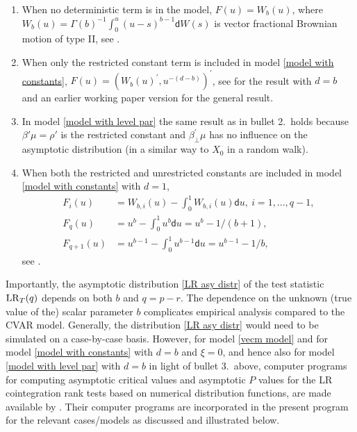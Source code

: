\documentclass[article]{jss}
\def\lrt{{\rm LR}_T}
\begin{document}
 \begin{enumerate}
 \item When no deterministic term is in the model, $F(u)=W_{b}(u)$, where $W_{b}(u)=\Gamma(b)^{-1}\int_{0}^{u}(u-s)^{b-1}\mathsf{d}W(s)$ is vector fractional Brownian motion of type II, see \citet[Theorem 11(i)]{johansen2012likelihood}.
 \item When only the restricted constant term is included in model \eqref{model with constants}, $F(u)=(W_{b}(u)^{\prime},u^{-(d-b)})^{\prime }$, see \citet[Theorem 11(iv)]{johansen2012likelihood} for the result with $d=b$ and an earlier working paper version for the general result.
\item In model \eqref{model with level par} the same result as in bullet 2.\ holds because $\beta'\mu = \rho'$ is the restricted constant and $\beta_\perp^{\prime} \mu$ has no influence on the asymptotic distribution (in a similar way to $X_0$ in a random walk).
 \item When both the restricted and unrestricted constants are included in model \eqref{model with constants} with $d=1$,
\begin{align*}
F_{i}(u) &= W_{b,i}(u) - \int_{0}^{1} W_{b,i}(u) \mathsf{d} u, \ i=1,...,q-1, \\
F_{q}(u) &= u^{b} - \int_{0}^{1}u^{b} \mathsf{d} u=u^{b}-1/(b+1), \\
F_{q+1}(u) &= u^{b-1} - \int_{0}^{1}u^{b-1} \mathsf{d} u = u^{b-1}-1/b, 
\end{align*}
see \cite{Dolatabadi2014}.
\end{enumerate}

Importantly, the asymptotic distribution \eqref{LR asy distr} of the test statistic $\lrt(q)$ depends on both $b$ and $q=p-r$. The dependence on the unknown (true value of the) scalar parameter $b$ complicates empirical analysis compared to the CVAR model. Generally, the distribution \eqref{LR asy distr} would need to be simulated on a case-by-case basis. However, for model \eqref{vecm model} and for model \eqref{model with constants} with $d=b$ and $\xi=0$, and hence also for model \eqref{model with level par} with $d=b$ in light of bullet 3.\ above, computer programs for computing asymptotic critical values and asymptotic $P$ values for the LR cointegration rank tests based on numerical distribution functions, are made available by \cite{mackinnon2014numerical}. Their computer programs are incorporated in the present program for the relevant cases/models as discussed and illustrated below.
\end{document}
